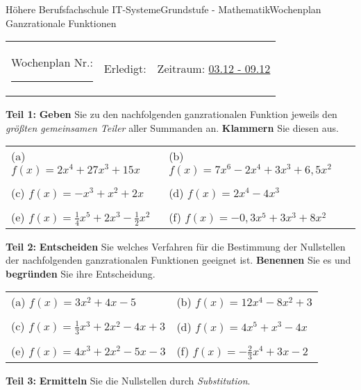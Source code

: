 \documentclass[oneside,openany,headings=optiontotoc,11pt,numbers=noenddot]{scrreprt}
\begin{document}
	\begin{worksheet}{Höhere Berufsfachschule IT-Systeme}{Grundstufe - Mathematik}{Wochenplan Ganzrationale Funktionen}
		\noindent
		\begin{tabularx}{\textwidth}{XXl}
			Wochenplan Nr.: \rule{0.15\textwidth}{1pt} & Erledigt: & Zeitraum: \underline{03.12 - 09.12}
		\end{tabularx}
	
		\begin{framed}
			\noindent
			\textbf{Teil 1:} \textbf{Geben} Sie zu den nachfolgenden ganzrationalen Funktion jeweils den \textit{größten gemeinsamen Teiler} aller Summanden an. \textbf{Klammern} Sie diesen aus.\\
			\par\noindent
			\begin{tabularx}{\textwidth}{XX}
				(a) \(f(x) = 2x^4 + 27x^3 + 15x\) & (b) \(f(x) = 7x^6 - 2x^4 + 3x^3 + 6,5x^2\)\\
				\\
				(c) \(f(x) = -x^3 + x^2 +2x\) & (d) \(f(x) = 2x^4 - 4x^3\)\\
				\\
				(e) \(f(x) = \frac{1}{4}x^5 + 2x^3 - \frac{1}{2}x^2\) & (f) \(f(x) = - 0,3x^5 + 3x^3 + 8x^2\)\\
			\end{tabularx}
		\end{framed}
		\begin{framed}
			\noindent
			\textbf{Teil 2:} \textbf{Entscheiden} Sie welches Verfahren für die Bestimmung der Nullstellen der nachfolgenden ganzrationalen Funktionen geeignet ist. \textbf{Benennen} Sie es und \textbf{begründen} Sie ihre Entscheidung.\\
			\par\noindent
			\begin{tabularx}{\textwidth}{XX}
				(a) \(f(x) = 3x^2 + 4x -5\) & (b) \(f(x) = 12x^4 - 8x^2 + 3\)\\
				\\
				(c) \(f(x) = \frac{1}{3}x^3 + 2x^2 - 4x + 3\) & (d) \(f(x) = 4x^5 + x^3 - 4x\)\\
				\\
				(e) \(f(x) = 4x^3 + 2x^2 -5x - 3\) & (f) \(f(x) = -\frac{2}{3}x^4 + 3x - 2\)
			\end{tabularx}
		\end{framed}
		\normalsize
		\begin{framed}
			\noindent
			\textbf{Teil 3:} \textbf{Ermitteln} Sie die Nullstellen durch \textit{Substitution}.\\

\end{framed}
\end{worksheet}
\end{document}
